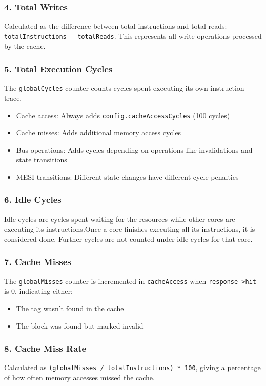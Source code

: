 \documentclass[11pt]{article}
\begin{document}
\subsubsection*{4. Total Writes}
Calculated as the difference between total instructions and total reads: \texttt{totalInstructions - totalReads}. This represents all write operations processed by the cache.

\subsubsection*{5. Total Execution Cycles}
The \texttt{globalCycles} counter counts cycles spent executing its own instruction trace.
\begin{itemize}
  \item Cache access: Always adds \texttt{config.cacheAccessCycles} (100 cycles)
  \item Cache misses: Adds additional memory access cycles
  \item Bus operations: Adds cycles depending on operations like invalidations and state transitions
  \item MESI transitions: Different state changes have different cycle penalties
\end{itemize}

\subsubsection*{6. Idle Cycles}
Idle cycles are cycles spent waiting for the resources while other cores
are executing its instructions.Once a core finishes executing all its instructions, it is considered done.
Further cycles are not counted under idle cycles for that core.

\subsubsection*{7. Cache Misses}
The \texttt{globalMisses} counter is incremented in \texttt{cacheAccess} when \texttt{response->hit} is 0, indicating either:
\begin{itemize}
  \item The tag wasn't found in the cache
  \item The block was found but marked invalid
\end{itemize}

\subsubsection*{8. Cache Miss Rate}
Calculated as \texttt{(globalMisses / totalInstructions) * 100}, giving a percentage of how often memory accesses missed the cache.
\end{document}
